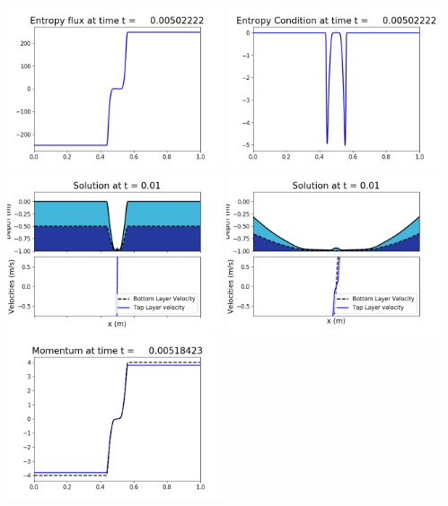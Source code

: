 \documentclass[11pt]{article}
\begin{document}
\includegraphics[width=0.475\textwidth]{frame0032fig1008.png}
\vskip 10pt 
\includegraphics[width=0.475\textwidth]{frame0032fig1009.png}
\vskip 10pt 
\includegraphics[width=0.475\textwidth]{frame0033fig1001.png}
\includegraphics[width=0.475\textwidth]{frame0033fig1002.png}
\vskip 10pt 
\includegraphics[width=0.475\textwidth]{frame0033fig1003.png}
\end{document}
